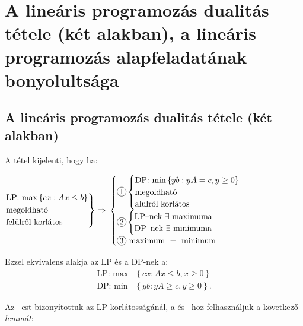 \skiptooddpage%
\section[A lineáris programozás dualitás tétele]{A lineáris programozás dualitás
  tétele (két alakban), a lineáris programozás alapfeladatának bonyolultsága}

\subsection{A lineáris programozás dualitás tétele (két alakban)}
A tétel kijelenti, hogy ha:

$ \begin{rcases}
		\mbox{LP: max}\left\{cx:Ax \leq b\right\} \\
		\mbox{megoldható}                         \\
		\mbox{felülről korlátos}
	\end{rcases} \Rightarrow$ $\begin{cases}
		\circled{1} \begin{cases}
			            \mbox{DP: min} \left\{ yb:yA = c, y \geq 0 \right\} \\
			            \mbox{megoldható}                                   \\
			            \mbox{alulról korlátos}
		            \end{cases} \\
		\circled{2} \begin{cases}
			            \mbox{LP--nek } \exists \mbox{ maximuma} \\
			            \mbox{DP--nek } \exists \mbox{ minimuma}
		            \end{cases}            \\
		\circled{3} \mbox{ maximum } = \mbox{ minimum}
	\end{cases}$

Ezzel ekvivalens alakja az LP és a DP-nek a:
\begin{align*}
	\mbox{LP: max} & \left\{ cx:Ax \leq b, x \geq 0 \right\}  \\
	\mbox{DP: min} & \left\{ yb:yA \geq c, y \geq 0 \right\}.
\end{align*}

Az --est bizonyítottuk az LP korlátosságánál, a  és
--hoz felhasználjuk a következő \emph{lemmát}:

